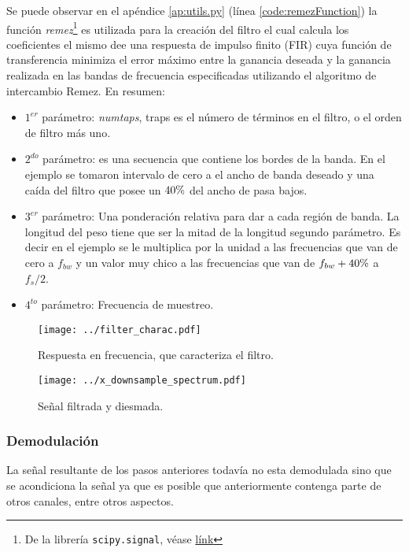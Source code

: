 Se puede observar en el apéndice \ref{ap:utils.py} (línea \ref{code:remezFunction}) la función \emph{remez}\footnote{De la librería \texttt{scipy.signal}, véase \href{https://docs.scipy.org/doc/scipy/reference/generated/scipy.signal.remez.html}{línk}} es utilizada para la creación del filtro el cual calcula los coeficientes el mismo dee una respuesta de impulso finito (FIR) cuya función de transferencia minimiza el error máximo entre la ganancia deseada y la ganancia realizada en las bandas de frecuencia especificadas utilizando el algoritmo de intercambio Remez.
En resumen:
\begin{itemize}
	\item $1^{er}$ parámetro: \emph{numtaps}, traps es el número de términos en el filtro, o el orden de filtro más uno.
	\item $2^{do}$ parámetro: es una secuencia que contiene los bordes de la banda.
	En el ejemplo se tomaron intervalo de cero a el ancho de banda deseado y una caída del filtro que posee un $40\%$ del ancho de pasa bajos. 
	\item $3^{er}$ parámetro: Una ponderación relativa para dar a cada región de banda. La longitud del peso tiene que ser la mitad de la longitud segundo parámetro.
	Es decir en el ejemplo se le multiplica por la unidad a las frecuencias que van de cero a $f_{bw}$ y un valor muy chico a las frecuencias que van de $f_{bw} + 40\%$ a $f_s/2$.
	\item $4^{to}$ parámetro: Frecuencia de muestreo.
\end{itemize}

\begin{figure}[ht!]
	\centering
	\texttt{[image: ../filter\_charac.pdf]}
	\caption{Respuesta en frecuencia, que caracteriza el filtro.}
	\label{fig:filter_charac}
\end{figure}

\begin{figure}[ht!]
	\centering
	\texttt{[image: ../x\_downsample\_spectrum.pdf]}
	\caption{Señal filtrada y diesmada.}
	\label{fig:x_downsample_spectrum}
\end{figure}

\subsubsection{Demodulación}
La señal resultante de los pasos anteriores todavía no esta demodulada sino que se acondiciona la señal ya que es posible que anteriormente contenga parte de otros canales, entre otros aspectos. 


